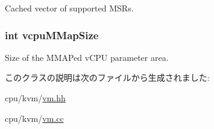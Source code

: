\label{classKvm_a5553ee613be7488e7c7c28058dc7d487}
Cached vector of supported MSRs. \hypertarget{classKvm_a0915679bdc25b2c015f15996f6d4ff6d}{
\subsubsection[{vcpuMMapSize}]{\setlength{\rightskip}{0pt plus 5cm}int {\bf vcpuMMapSize}}}
\label{classKvm_a0915679bdc25b2c015f15996f6d4ff6d}
Size of the MMAPed vCPU parameter area. 

このクラスの説明は次のファイルから生成されました:\begin{DoxyCompactItemize}
\item 
cpu/kvm/\hyperlink{vm_8hh}{vm.hh}\item 
cpu/kvm/\hyperlink{vm_8cc}{vm.cc}\end{DoxyCompactItemize}
